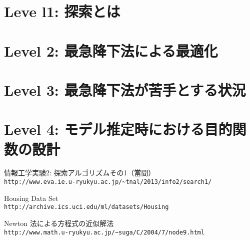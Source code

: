 \documentclass[10pt]{jarticle}
\begin{document}
\newpage

\section{Leve l1: 探索とは}



\newpage

\section{Level 2: 最急降下法による最適化}




\newpage

\section{Level 3: 最急降下法が苦手とする状況}
%
%

\newpage

\section{Level 4: モデル推定時における目的関数の設計}

%


\vspace{+1.0cm}
\begin{thebibliography}{99}
情報工学実験2: 探索アルゴリズムその1（當間）\\
\verb|http://www.eva.ie.u-ryukyu.ac.jp/~tnal/2013/info2/search1/|

Housing Data Set\\
\verb|http://archive.ics.uci.edu/ml/datasets/Housing|

Newton 法による方程式の近似解法\\
\verb|http://www.math.u-ryukyu.ac.jp/~suga/C/2004/7/node9.html|

\end{thebibliography}
\end{document}
